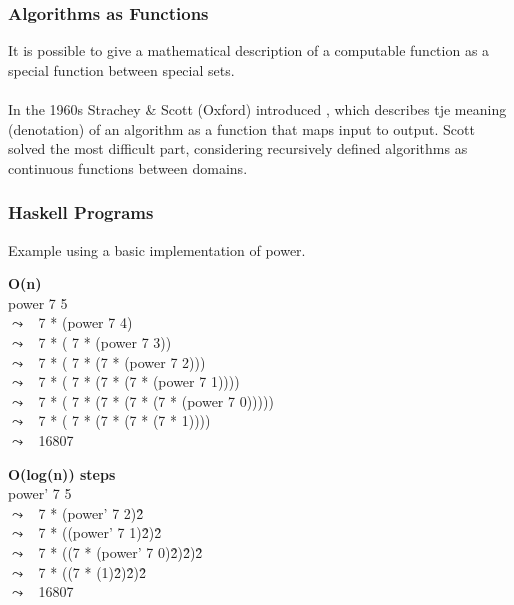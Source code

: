 \documentclass{report}
\begin{document}
        \subsubsection*{Algorithms as Functions}
            It is possible to give a mathematical description of a computable function as a special function between special sets.
            \\
            \\ In the 1960s Strachey \& Scott (Oxford) introduced , which describes tje meaning (denotation)
            of an algorithm as a function that maps input to output.
            Scott solved the most difficult part, considering recursively defined algorithms as continuous functions between domains.


        \subsubsection*{Haskell Programs}
            Example using a basic implementation of power.
            

            \newcommand{\step}[1]{$\leadsto$ \ #1\\}
            
            \begin{minipage}{.5\textwidth}
                \textbf{O(n)} \\
                power 7 5 \\
                \step{7 * (power 7 4)}
                \step{7 * ( 7 * (power 7 3))}
                \step{7 * ( 7 * (7 * (power 7 2)))}
                \step{7 * ( 7 * (7 * (7 * (power 7 1))))}
                \step{7 * ( 7 * (7 * (7 * (7 * (power 7 0)))))}
                \step{7 * ( 7 * (7 * (7 * (7 * 1))))}
                \step{16807}
            \end{minipage} \begin{minipage}{.5\textwidth}
                \textbf{O(log(n)) steps} \\
                power' 7 5 \\
                \step{7 * (power' 7 2)\^2}
                \step{7 * ((power' 7 1)\^2)\^2}
                \step{7 * ((7 * (power' 7 0)\^2)\^2)\^2}
                \step{7 * ((7 * (1)\^2)\^2)\^2}
                \step{16807}
            \end{minipage}
\end{document}
